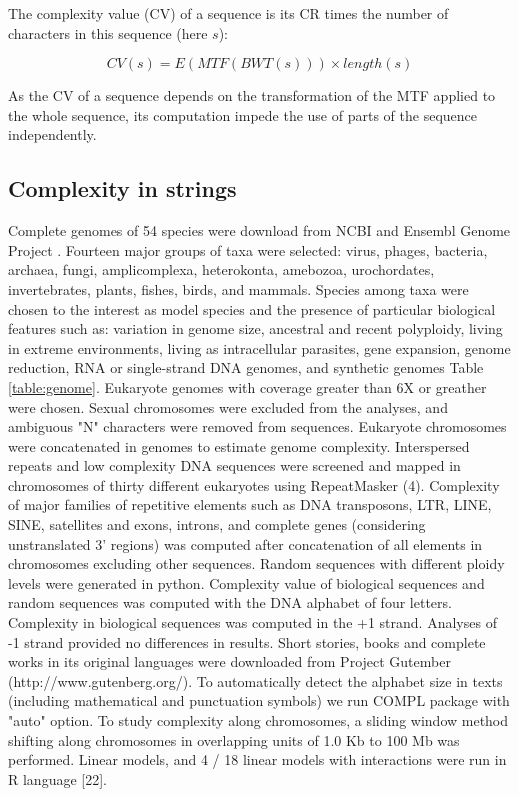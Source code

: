 The complexity value (CV) of a sequence is its CR times the number of
characters in this sequence (here $s$):

\begin{equation} \label{eq:cv}
CV(s) = E(MTF(BWT(s))) \times length(s)
\end{equation}

As the CV of a sequence depends on the transformation of the MTF
applied to the whole sequence, its computation impede the use of parts
of the sequence independently.

\subsection{Complexity in strings}

Complete genomes of 54 species were download from NCBI and Ensembl
Genome Project \cite{Flicek2011}. Fourteen major groups of taxa were
selected: virus, phages, bacteria, archaea, fungi, amplicomplexa, heterokonta, amebozoa, urochordates, invertebrates, plants, fishes, birds,
and mammals. Species among taxa were chosen to the interest as model
species and the presence of particular biological features such as:
variation in genome size, ancestral and recent polyploidy, living in extreme environments, living as intracellular parasites, gene
expansion, genome reduction, RNA or single-strand DNA genomes, and
synthetic genomes Table \ref{table:genome}. Eukaryote genomes with coverage greater than 6X or greather were chosen.
Sexual chromosomes were excluded from the analyses, and ambiguous "N" characters were
removed from sequences. Eukaryote chromosomes were concatenated in genomes to
estimate genome complexity. Interspersed repeats and low complexity DNA sequences were
screened and mapped in chromosomes of thirty different eukaryotes using RepeatMasker (4).
Complexity of major families of repetitive elements such as DNA transposons, LTR, LINE,
SINE, satellites and exons, introns, and complete genes (considering unstranslated 3' regions)
was computed after concatenation of all elements in chromosomes excluding other sequences.
Random sequences with different ploidy levels were generated in python. Complexity value
of biological sequences and random sequences was computed with the DNA alphabet of four
letters. Complexity in biological sequences was computed in the +1 strand. Analyses of -1
strand provided no differences in results. Short stories, books and complete works in its
original languages were downloaded from Project Gutember (http://www.gutenberg.org/). To
automatically detect the alphabet size in texts (including mathematical and punctuation
symbols) we run COMPL package with "auto" option.
To study complexity along chromosomes, a sliding window method shifting along
chromosomes in overlapping units of 1.0 Kb to 100 Mb was performed. Linear models, and
4 / 18
linear models with interactions were run in R language [22].


